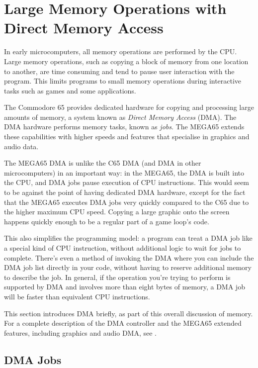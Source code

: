 \newpage
\section{Large Memory Operations with Direct Memory Access}

In early microcomputers, all memory operations are performed by the CPU. Large
memory operations, such as copying a block of memory from one location to
another, are time consuming and tend to pause user interaction with the program. This
limits programs to small memory operations during interactive tasks such as
games and some applications.

The Commodore 65 provides dedicated hardware for copying and processing large
amounts of memory, a system known as {\em Direct Memory Access} (DMA). The DMA
hardware performs memory tasks, known as {\em jobs}. The MEGA65 extends these
capabilities with higher speeds and features that specialise in
graphics and audio data.

The MEGA65 DMA is unlike the C65 DMA (and DMA in other microcomputers) in an
important way: in the MEGA65, the DMA is built into the CPU, and DMA jobs
pause execution of CPU instructions. This would seem to be against the point
of having dedicated DMA hardware, except for the fact that the MEGA65 executes
DMA jobs very quickly compared to the C65 due to the higher maximum CPU speed.
Copying a large graphic onto the screen happens quickly enough to be a regular
part of a game loop's code.

This also simplifies the programming model: a program can treat a DMA job like
a special kind of CPU instruction, without additional logic to wait for jobs
to complete. There's even a method of invoking the DMA where you can include
the DMA job list directly in your code, without having to reserve additional
memory to describe the job. In general, if the operation you're trying to
perform is supported by DMA and involves more than eight bytes of memory, a
DMA job will be faster than equivalent CPU instructions.

This section introduces DMA briefly, as part of this overall discussion of
memory. For a complete description of the DMA controller and the MEGA65
extended features, including graphics and audio DMA, see .

\subsection{DMA Jobs}

